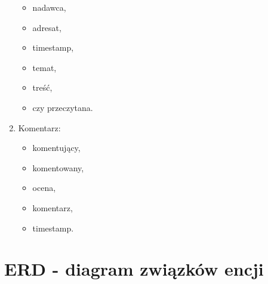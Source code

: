 \begin{enumerate}
\begin{itemize}
	\item nadawca,
	\item adresat,
	\item timestamp,
	\item temat,
	\item treść,
	\item czy przeczytana.
	\end{itemize}
\item Komentarz:
	\begin{itemize}
	\item komentujący,
	\item komentowany,
	\item ocena,
	\item komentarz,
	\item timestamp.
	\end{itemize}
\end{enumerate}


\clearpage
\section{ERD - diagram związków encji}
\label{sec:ERD}

